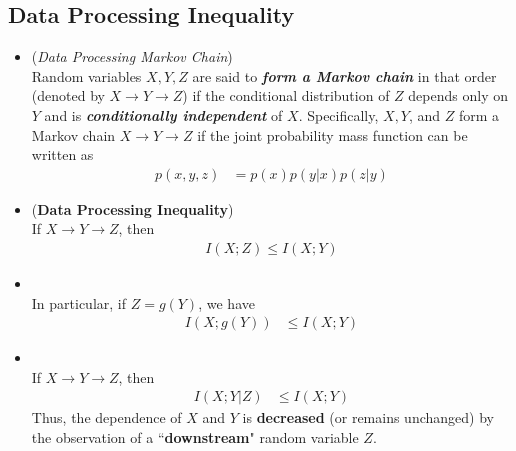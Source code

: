 \documentclass[11pt]{article}
\begin{document}
\subsection{Data Processing Inequality}
\begin{itemize}
\item \begin{definition} (\emph{Data Processing Markov Chain})\\
Random variables $X, Y, Z$ are said to \emph{\textbf{form a Markov chain}} in that order (denoted by $X \to Y \to Z$) if the conditional distribution of $Z$ depends only on $Y$ and is \emph{\textbf{conditionally independent}} of $X$. Specifically, $X, Y$, and $Z$ form a Markov chain $X \to Y \to Z$ if the joint probability mass function can be written as
\begin{align*}
p(x, y, z) &= p(x) p(y | x) p(z | y)
\end{align*}
\end{definition}

\item \begin{proposition} (\textbf{Data Processing Inequality})   \citep{thomas2006elements}\\
If $X \to Y \to Z$, then
\begin{align*}
I(X; Z) \le I(X; Y)
\end{align*}
\end{proposition}

\item \begin{corollary}\citep{thomas2006elements}\\
In particular, if $Z = g(Y)$, we have 
\begin{align*}
I(X; g(Y)) &\le I(X; Y)
\end{align*}
\end{corollary}

\item \begin{corollary}\citep{thomas2006elements}\\
If $X \to Y \to Z$, then
\begin{align*}
I(X; Y| Z) &\le I(X; Y)
\end{align*} Thus, the dependence of $X$ and $Y$ is \textbf{decreased} (or remains unchanged) by the observation of a ``\textbf{downstream}" random variable $Z$. 
\end{corollary}
\end{itemize}
\end{document}
